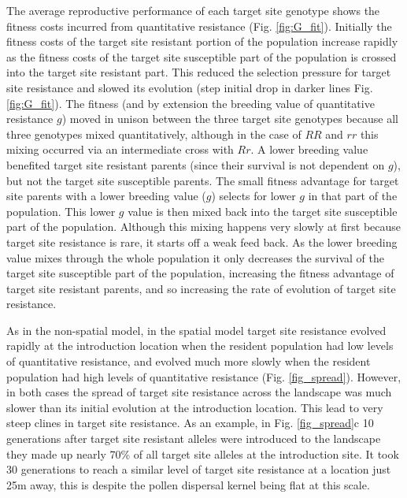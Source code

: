 \documentclass[10pt,letterpaper]{article}
\begin{document}
The average reproductive performance of each target site genotype shows the fitness costs incurred from quantitative resistance (Fig. \ref{fig:G_fit}). Initially the fitness costs of the target site resistant portion of the population increase rapidly as the fitness costs of the target site susceptible part of the population is crossed into the target site resistant part. This reduced the selection pressure for target site resistance and slowed its evolution (step initial drop in darker lines Fig. \ref{fig:G_fit}). The fitness (and by extension the breeding value of quantitative resistance $g$) moved in unison between the three target site genotypes because all three genotypes mixed quantitatively, although in the case of $RR$ and $rr$ this mixing occurred via an intermediate cross with $Rr$. A lower breeding value benefited target site resistant parents (since their survival is not dependent on $g$), but not the target site susceptible parents. The small fitness advantage for target site parents with a lower breeding value ($g$) selects for lower $g$ in that part of the population. This lower $g$ value is then mixed back into the target site susceptible part of the population. Although this mixing happens very slowly at first because target site resistance is rare, it starts off a weak feed back. As the lower breeding value mixes through the whole population it only decreases the survival of the target site susceptible part of the population, increasing the fitness advantage of target site resistant parents, and so increasing the rate of evolution of target site resistance.                           

As in the non-spatial model, in the spatial model target site resistance evolved rapidly at the introduction location when the resident population had low levels of quantitative resistance, and evolved much more slowly when the resident population had high levels of quantitative resistance (Fig. \ref{fig_spread}). However, in both cases the spread of target site resistance across the landscape was much slower than its initial evolution at the introduction location. This lead to very steep clines in target site resistance. As an example, in Fig. \ref{fig_spread}c 10 generations after target site resistant alleles were introduced to the landscape they made up nearly 70\% of all target site alleles at the introduction site. It took 30 generations to reach a similar level of target site resistance at a location just 25m away, this is despite the pollen dispersal kernel being flat at this scale. 
\end{document}
